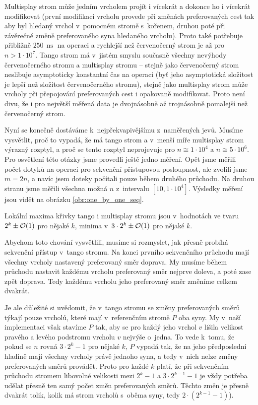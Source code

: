 Multisplay strom může jedním vrcholem projít i vícekrát a dokonce
ho i vícekrát modifikovat (první modifikaci vrcholu provede při změnách
preferovaných cest tak aby byl hledaný vrchol v~pomocném stromě s~kořenem,
druhou poté při závěrečné změně preferovaného syna hledaného vrcholu). Proto
také potřebuje přibližně $250\,\operatorname{ns}$ na operaci a rychlejší než
červenočerný strom je až pro $n>1\cdot 10^7$. Tango strom má v~jistém smyslu
současně všechny nevýhody červenočerného stromu a multisplay stromu -- stejně
jako červenočerný strom neslibuje asymptoticky konstantní čas na operaci (byť
jeho asymptotická složitost je lepší než složitost červenočerného stromu),
stejně jako multisplay strom může vrcholy při přepojování preferovaných cest i
opakovaně modifikovat. Proto není divu, že i pro největší měřená data je
dvojnásobně až trojnásobně pomalejší než červenočerný strom.

Nyní se konečně dostáváme k~nejpřekvapivějšímu z~naměřených jevů. Musíme
vysvětlit, proč to vypadá, že má tango strom a v~menší míře multisplay strom
výrazný rozptyl, a proč se tento rozptyl neprojevuje pro $n\cong 1\cdot 10^4$ a
$n\cong 5\cdot10^6$. Pro osvětlení této otázky jsme provedli ještě jedno
měření. Opět jsme měřili počet dotyků na operaci pro sekvenční přístupovou
posloupnost, ale zvolili jsme $m=2n$, a navíc jsem doteky počítali pouze během
druhého průchodu. Na druhou stranu jsme měřili všechna možná $n$ z~intervalu
$[10, 1\cdot10^4]$. Výsledky měření jsou vidět na obrázku
\ref{obr:one_by_one_seq}.


Lokální maxima křivky tango i multisplay stromu jsou v~hodnotách ve tvaru $2^k \pm \mathcal O(1)$ pro nějaké $k$, minima v~$3\cdot 2^k\pm \mathcal O(1)$ pro nějaké $k$. 

Abychom toto chování vysvětlili, musíme si rozmyslet, jak přesně probíhá
sekvenční přístup v~tango stromu. Na konci prvního sekvenčního průchodu mají
všechny vrcholy nastavený preferovaný směr doprava. My musíme během průchodu
nastavit každému vrcholu preferovaný směr nejprve doleva, a poté zase zpět
doprava. Tedy každému vrcholu jeho preferovaný směr změníme celkem dvakrát.

Je ale důležité si uvědomit, že v~tango stromu se změny preferovaných směrů
týkají pouze vrcholů, které mají v~referenčním stromě $P$ oba syny. My v~naší
implementaci však stavíme $P$ tak, aby se pro každý jeho vrchol $v$ lišila
velikost pravého a levého podstromu vrcholu $v$ nejvýše o~jedna. To vede k~tomu, že pokud se
$n$ rovná $3\cdot2^k-1$ pro nějaké $k$, $P$ vypadá tak, že na jeho předposlední
hladině mají všechny vrcholy právě jednoho syna, a tedy v~nich nelze změny
preferovaných směrů provádět. Proto pro každé $k$ platí, že při sekvenčním
průchodu stromem libovolné velikosti mezi $2^k-1$ a $3\cdot 2^{k-1}-1$ je vždy
potřeba udělat přesně ten samý počet změn preferovaných směrů. Těchto změn je přesně
dvakrát tolik, kolik má strom vrcholů s~oběma syny, tedy $2\cdot(2^{k-1} -1)$).

